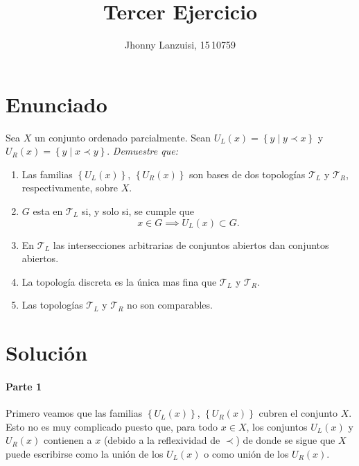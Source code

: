 \documentclass[fleqn,leqno,10pt,letterpaper,draft]{article}
\title{Tercer Ejercicio}
\author{Jhonny Lanzuisi, 15\,10759}
\begin{document}
\maketitle
\tableofcontents
{}

\section[Enunciado]{Enunciado}

Sea $X$ un conjunto ordenado parcialmente. Sean $U_L(x)=\left\{ y\mid y\prec x \right\}$ y
$U_R(x)=\left\{ y\mid x\prec y \right\}$. \textit{Demuestre que:} 
\begin{enumerate}
	\item Las familias $\left\{ U_L(x) \right\}$, $\left\{ U_R(x) \right\}$ son bases de dos topologías
	$\mathcal{T}_L$ y $\mathcal{T}_R$, respectivamente, sobre $X$.
	\item $G$ esta en $\mathcal{T}_L$ si, y solo si, se cumple que 
		\[
			x\in G\implies U_L(x)\subset G.
		\]
	\item En $\mathcal{T}_L$ las intersecciones arbitrarias de conjuntos abiertos dan conjuntos abiertos.
	\item La topología discreta es la única mas fina que $\mathcal{T}_L$ y $\mathcal{T}_R$.
	\item Las topologías $\mathcal{T}_L$ y $\mathcal{T}_R$ no son comparables. 
\end{enumerate}

\section{Solución}

\paragraph{Parte 1}%

Primero veamos que las familias $\left\{ U_L(x) \right\}$, $\left\{ U_R(x) \right\}$
cubren el conjunto $X$. Esto no es muy complicado puesto que, para todo $x\in X$,
los conjuntos $ U_L(x) $ y $ U_R(x) $ contienen a $x$ 
(debido a la reflexividad de $\prec$) de donde se sigue que $X$ puede escribirse
como la unión de los $U_L(x)$ o como unión de los $U_R(x)$.
\end{document}
